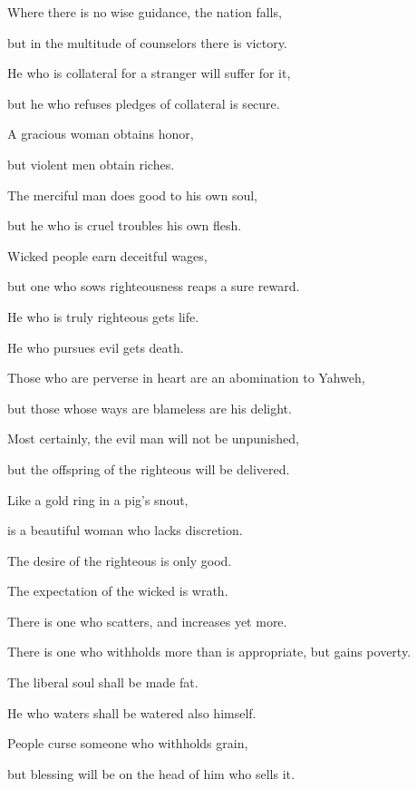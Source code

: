 {\par }{\Q {}Where there is no wise guidance, the nation falls,
\par }{\QB but in the multitude of counselors there is victory.
\par }{\Q {}He who is collateral for a stranger will suffer for it,
\par }{\QB but he who refuses pledges of collateral is secure.
\par }{\Q {}A gracious woman obtains honor,
\par }{\QB but violent men obtain riches.
\par }{\Q {}The merciful man does good to his own soul,
\par }{\QB but he who is cruel troubles his own flesh.
\par }{\Q {}Wicked people earn deceitful wages,
\par }{\QB but one who sows righteousness reaps a sure reward.
\par }{\Q {}He who is truly righteous gets life.
\par }{\QB He who pursues evil gets death.
\par }{\Q {}Those who are perverse in heart are an abomination to Yahweh,
\par }{\QB but those whose ways are blameless are his delight.
\par }{\Q {}Most certainly, the evil man will not be unpunished,
\par }{\QB but the offspring of the righteous will be delivered.
\par }{\Q {}Like a gold ring in a pig’s snout,
\par }{\QB is a beautiful woman who lacks discretion.
\par }{\Q {}The desire of the righteous is only good.
\par }{\QB The expectation of the wicked is wrath.
\par }{\Q {}There is one who scatters, and increases yet more.
\par }{\QB There is one who withholds more than is appropriate, but gains poverty.
\par }{\Q {}The liberal soul shall be made fat.
\par }{\QB He who waters shall be watered also himself.
\par }{\Q {}People curse someone who withholds grain,
\par }{\QB but blessing will be on the head of him who sells it.
}
